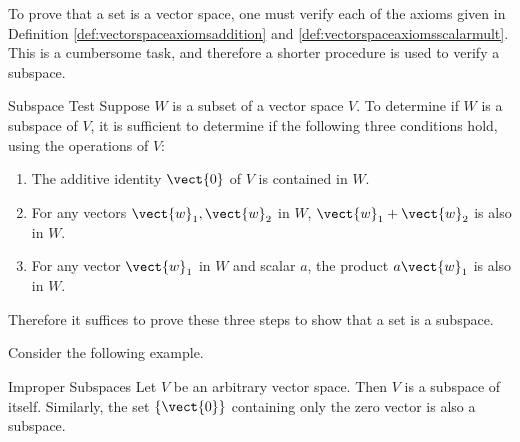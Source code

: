 To prove that a set is a vector space, one must verify each of the axioms given in Definition \ref{def:vectorspaceaxiomsaddition} and \ref{def:vectorspaceaxiomsscalarmult}. This is a cumbersome task, and therefore a shorter procedure is used to verify a subspace. 

\begin{procedure}{Subspace Test}\label{proc:subspacetest}
Suppose $W$ is a subset of a vector space $V$. To determine if $W$ is a subspace of $V$, it is sufficient to determine if the following three conditions hold, using the operations of $V$: 
\begin{enumerate}
\item
The additive identity $\vect{0}$ of $V$ is contained in $W$.
\item
For any vectors $\vect{w}_1, \vect{w}_2$ in $W$, $\vect{w}_1 + \vect{w}_2$ is also in $W$.
\item
For any vector $\vect{w}_1$ in $W$ and scalar $a$,  the product $a\vect{w}_1$ is also in $W$. 
\end{enumerate}
\end{procedure}

Therefore it suffices to prove these three steps to show that a set is a subspace. 

Consider the following example.

\begin{example}{Improper Subspaces}\label{exa:impropersubspaces}
Let $V$ be an arbitrary vector space. Then $V$ is a subspace of itself. Similarly, the set $\left\{ \vect{0} \right\}$ containing only the zero vector is also a subspace. 
\end{example}

